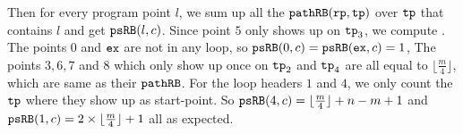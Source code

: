 Then for every program point $l$, we sum up all the $\mathtt{pathRB}(\mathtt{rp}, \mathtt{tp})$ over $\mathtt{tp}$ that contains $l$ and get $\mathtt{psRB}(l, c)$.
Since point $5$ only shows up on $\mathtt{tp}_3$, we compute .
The points $0$ and $\mathtt{ex}$ are not in any loop, so $\mathtt{psRB}(0, c) = \mathtt{psRB}(\mathtt{ex}, c) = 1$,
The points $3, 6, 7$ and $8$ which only show up once on $\mathtt{tp}_2$ and $\mathtt{tp}_4$ are all equal to $\lfloor\frac{m}{4}\rfloor$, which are same as their $\mathtt{pathRB}$.
For the loop headers $1$ and $4$, we only count the $\mathtt{tp}$ where they show up as start-point.
So $\mathtt{psRB}(4, c) =  \lfloor\frac{m}{4}\rfloor + n - m + 1$ and $\mathtt{psRB}(1,c) = 2 \times \lfloor\frac{m}{4}\rfloor + 1$ all as expected.